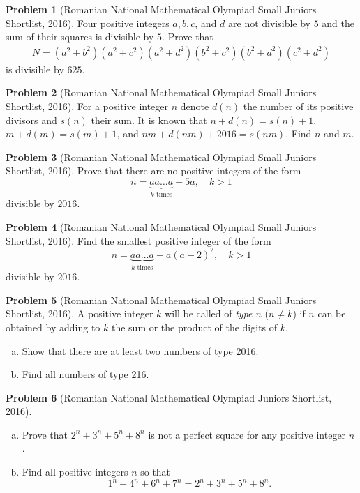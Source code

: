 \documentclass[]{article}
\theoremstyle{definition}
\newtheorem{problem}{Problem}
\begin{document}
\begin{problem}[Romanian National Mathematical Olympiad Small Juniors Shortlist, 2016]
	Four positive integers $a, b, c$, and $d$ are not divisible by $5$ and the sum of their squares is divisible by $5$. Prove that
		\begin{align*}
			N = (a^2 + b^2)(a^2 + c^2)(a^2 + d^2)(b^2 + c^2)(b^2 + d^2)(c^2 + d^2)
		\end{align*}
	is divisible by $625$.
\end{problem}



\begin{problem}[Romanian National Mathematical Olympiad Small Juniors Shortlist, 2016]
	For a positive integer $n$ denote $d(n)$ the number of its positive divisors and $s(n)$ their sum. It is known that $n + d(n) = s(n) + 1$, $m + d(m) = s(m) + 1$, and $nm + d(nm) + 2016 = s(nm)$. Find $n$ and $m$.
\end{problem}



\begin{problem}[Romanian National Mathematical Olympiad Small Juniors Shortlist, 2016]
	Prove that there are no positive integers of the form $$n = \underbrace{\overline{aa\dots a}}_{k\text{ times}} + 5a , \quad k >1$$ divisible by $2016$.
\end{problem}



\begin{problem}[Romanian National Mathematical Olympiad Small Juniors Shortlist, 2016]
	Find the smallest positive integer of the form $$n = \underbrace{\overline{aa\dots a}}_{k\text{ times}} + a(a-2)^2 , \quad k >1$$ divisible by $2016$.
\end{problem}


\begin{problem}[Romanian National Mathematical Olympiad Small Juniors Shortlist, 2016]
	A positive integer $k$ will be called of \textit{type $n$} ($n \neq k$) if $n$ can be obtained by adding to $k$ the sum or the product of the digits of $k$.
		\begin{enumerate}[(a)]
			\item Show that there are at least two numbers of type 2016.
			\item  Find all numbers of type 216.
		\end{enumerate}
\end{problem}


\begin{problem}[Romanian National Mathematical Olympiad Juniors Shortlist, 2016]
	$ $
	\begin{enumerate}[(a)]
		\item Prove that $2^n+3^n+5^n+8^n$ is not a perfect square for any positive integer $n$.
		\item Find all positive integers $n$ so that $$1^n + 4^n + 6^n + 7^n = 2^n + 3^n + 5^n + 8^n.$$
	\end{enumerate}
\end{problem}
\end{document}
